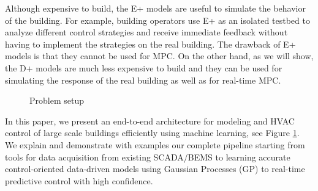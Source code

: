Although expensive to build, the E+ models are useful to simulate the behavior of the building. For example, building operators use E+ as an isolated testbed to analyze different control strategies and receive immediate feedback without having to implement the strategies on the real building.
The drawback of E+ models is that they cannot be used for MPC.
On the other hand, as we will show, the D+ models are much less expensive to build and they can be used for simulating the response of the real building as well as for real-time MPC.

\begin{figure}
	\caption{Problem setup}
	\label{F:intro}
\end{figure}

In this paper, we present an end-to-end architecture for modeling and HVAC control of large scale buildings efficiently using machine learning, see Figure \ref{F:intro}. 
We explain and demonstrate with examples our complete pipeline starting from tools for data acquisition from existing SCADA/BEMS to learning accurate control-oriented data-driven models using Gaussian Processes (GP) to real-time predictive control with high confidence.